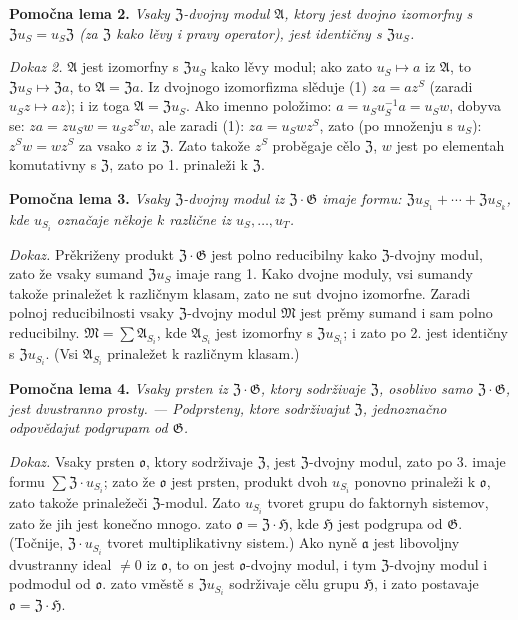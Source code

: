 \documentclass[11pt]{article}
\begin{document}
\noindent\textbf{Pomočna lema 2.} \emph{Vsaky \(\mathfrak Z\)-dvojny modul \(\mathfrak A\), ktory jest dvojno izomorfny s \(\mathfrak Zu_S=u_S\mathfrak Z\) (za \(\mathfrak Z\) kako lěvy i pravy operator), jest identičny s \(\mathfrak Zu_S\).}

\noindent\emph{Dokaz 2.} \(\mathfrak A\) jest izomorfny s \(\mathfrak Zu_S\) kako lěvy modul; ako zato \(u_S\mapsto a\) iz \(\mathfrak A\), to \(\mathfrak Zu_S\mapsto\mathfrak Za\), to \(\mathfrak A=\mathfrak Za\). Iz dvojnogo izomorfizma slěduje (1) \(za=az^S\) (zaradi \(u_Sz\mapsto az\)); i iz toga \(\mathfrak A=\mathfrak Zu_S\). Ako imenno položimo: \(a=u_Su_S^{-1}a=u_Sw\), dobyva se: \(za=zu_Sw=u_Sz^Sw\), ale zaradi (1): \(za=u_Swz^S\), zato (po množenju s \(u_S\)): \(z^Sw=wz^S\) za vsako \(z\) iz \(\mathfrak Z\). Zato takože \(z^S\) proběgaje cělo \(\mathfrak Z\), \(w\) jest po elementah komutativny s \(\mathfrak Z\), zato po 1. prinaleži k \(\mathfrak Z\).

\noindent\textbf{Pomočna lema 3.} \emph{Vsaky \(\mathfrak Z\)-dvojny modul iz \(\mathfrak Z\cdot\mathfrak G\) imaje formu: \(\mathfrak Zu_{S_1}+\cdots+\mathfrak Zu_{S_k}\), kde \(u_{S_i}\) označaje někoje \(k\) različne iz \(u_S,\ldots,u_T\).}

\noindent\emph{Dokaz.} Prěkriženy produkt \(\mathfrak Z\cdot\mathfrak G\) jest polno reducibilny kako \(\mathfrak Z\)-dvojny modul, zato že vsaky sumand \(\mathfrak Zu_S\) imaje rang 1. Kako dvojne moduly, vsi sumandy takože prinaležet k različnym klasam, zato ne sut dvojno izomorfne. Zaradi polnoj reducibilnosti vsaky \(\mathfrak Z\)-dvojny modul \(\mathfrak M\) jest prěmy sumand i sam polno reducibilny. \(\mathfrak M=\sum\mathfrak A_{S_i}\), kde \(\mathfrak A_{S_i}\) jest izomorfny s \(\mathfrak Zu_{S_i}\); i zato po 2. jest identičny s \(\mathfrak Zu_{S_i}\). (Vsi \(\mathfrak A_{S_i}\) prinaležet k različnym klasam.)

\noindent\textbf{Pomočna lema 4.} \emph{Vsaky prsten iz \(\mathfrak Z\cdot\mathfrak G\), ktory sodrživaje \(\mathfrak Z\), osoblivo samo \(\mathfrak Z\cdot\mathfrak G\), jest dvustranno prosty. --- Podprsteny, ktore sodrživajut \(\mathfrak Z\), jednoznačno odpovědajut podgrupam od \(\mathfrak G\).}

\noindent\emph{Dokaz.} Vsaky prsten \(\mathfrak o\), ktory sodrživaje \(\mathfrak Z\), jest \(\mathfrak Z\)-dvojny modul, zato po 3. imaje formu \(\sum\mathfrak Z\cdot u_{S_i}\); zato že \(\mathfrak o\) jest prsten, produkt dvoh \(u_{S_i}\) ponovno prinaleži k \(\mathfrak o\), zato takože prinaležeči \(\mathfrak Z\)-modul. Zato \(u_{S_i}\) tvoret grupu do faktornyh sistemov, zato že jih jest konečno mnogo. zato \(\mathfrak o=\mathfrak Z\cdot\mathfrak H\), kde \(\mathfrak H\) jest podgrupa od \(\mathfrak G\). (Točnije, \(\mathfrak Z\cdot u_{S_i}\) tvoret multiplikativny sistem.) Ako nyně \(\mathfrak a\) jest libovoljny dvustranny ideal \(\neq0\) iz \(\mathfrak o\), to on jest \(\mathfrak o\)-dvojny modul, i tym \(\mathfrak Z\)-dvojny modul i podmodul od \(\mathfrak o\). zato vměstě s \(\mathfrak Zu_{S_i}\) sodrživaje cělu grupu \(\mathfrak H\), i zato postavaje \(\mathfrak o=\mathfrak Z\cdot\mathfrak H\).
\end{document}
